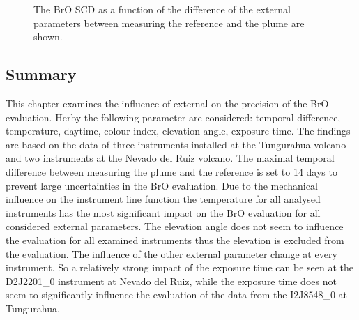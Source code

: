 \documentclass  [
  paper    = a4,
  BCOR     = 10mm,
  twoside,
  fontsize = 12pt,
  fleqn,
  toc      = bibnumbered,
  toc      = listofnumbered,
  numbers  = noendperiod,
  headings = normal,
  listof   = leveldown,
  version  = 3.03
]                                       {scrreprt}
\begin{document}
\begin{figure}
{}
\caption{The BrO SCD as a function of the difference of the external parameters between measuring the reference and the plume are shown.}
	\label{fig:difftempbroallinstruments}
\end{figure}
\FloatBarrier
	\subsection*{Summary}
This chapter examines the influence of external on the precision of the BrO evaluation. Herby the following parameter are considered: 
temporal difference, temperature, daytime, colour index, elevation angle, exposure time.  The findings are based on the data of three instruments installed at the Tungurahua volcano and two instruments at the Nevado del Ruiz volcano. The maximal temporal difference between measuring the plume and the reference is set to 14 days to prevent large uncertainties in the BrO evaluation. Due to the mechanical influence on the instrument line function the temperature for all analysed instruments has the most significant impact on the BrO evaluation for all considered external parameters. The elevation angle does not seem to influence the evaluation for all examined instruments thus the elevation is excluded from the evaluation. The influence of the other external parameter change at every instrument. So a relatively strong impact of the exposure time can be seen at the D2J2201\_0 instrument at Nevado del Ruiz, while the exposure time does not seem to significantly influence the evaluation of the data from the  I2J8548\_0 at Tungurahua. 
	
\end{document}
